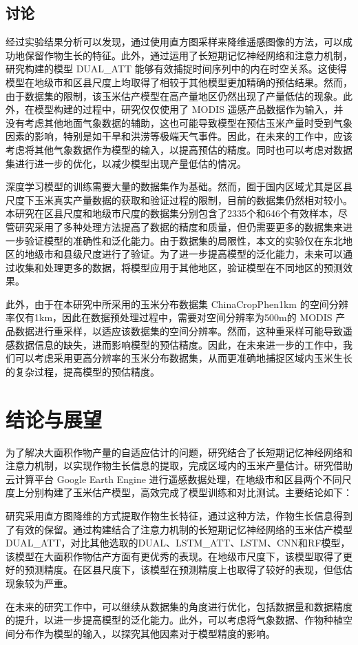 \subsection{讨论}
\par 经过实验结果分析可以发现，通过使用直方图采样来降维遥感图像的方法，可以成功地保留作物生长的特征。此外，通过运用了长短期记忆神经网络和注意力机制，研究构建的模型 DUAL\_ATT 能够有效捕捉时间序列中的内在时空关系。这使得模型在地级市和区县尺度上均取得了相较于其他模型更加精确的预估结果。然而，由于数据集的限制，该玉米估产模型在高产量地区仍然出现了产量低估的现象。此外，在模型构建的过程中，研究仅仅使用了 MODIS 遥感产品数据作为输入，并没有考虑其他地面气象数据的辅助，这也可能导致模型在预估玉米产量时受到气象因素的影响，特别是如干旱和洪涝等极端天气事件。因此，在未来的工作中，应该考虑将其他气象数据作为模型的输入，以提高预估的精度。同时也可以考虑对数据集进行进一步的优化，以减少模型出现产量低估的情况。

\par 深度学习模型的训练需要大量的数据集作为基础。然而，囿于国内区域尤其是区县尺度下玉米真实产量数据的获取和验证过程的限制，目前的数据集仍然相对较小。本研究在区县尺度和地级市尺度的数据集分别包含了2335个和646个有效样本，尽管研究采用了多种处理方法提高了数据的精度和质量，但仍需要更多的数据集来进一步验证模型的准确性和泛化能力。由于数据集的局限性，本文的实验仅在东北地区的地级市和县级尺度进行了验证。为了进一步提高模型的泛化能力，未来可以通过收集和处理更多的数据，将模型应用于其他地区，验证模型在不同地区的预测效果。

\par 此外，由于在本研究中所采用的玉米分布数据集 ChinaCropPhen1km 的空间分辨率仅有1km，因此在数据预处理过程中，需要对空间分辨率为500m的 MODIS 产品数据进行重采样，以适应该数据集的空间分辨率。然而，这种重采样可能导致遥感数据信息的缺失，进而影响模型的预估精度。因此，在未来进一步的工作中，我们可以考虑采用更高分辨率的玉米分布数据集，从而更准确地捕捉区域内玉米生长的复杂过程，提高模型的预估精度。

\section{结论与展望}
\par 为了解决大面积作物产量的自适应估计的问题，研究结合了长短期记忆神经网络和注意力机制，以实现作物生长信息的提取，完成区域内的玉米产量估计。研究借助云计算平台 Google Earth Engine 进行遥感数据处理，在地级市和区县两个不同尺度上分别构建了玉米估产模型，高效完成了模型训练和对比测试。主要结论如下：

\par 研究采用直方图降维的方式提取作物生长特征，通过这种方法，作物生长信息得到了有效的保留。通过构建结合了注意力机制的长短期记忆神经网络的玉米估产模型DUAL\_ATT，对比其他选取的DUAL、LSTM\_ATT、LSTM、CNN和RF模型，该模型在大面积作物估产方面有更优秀的表现。在地级市尺度下，该模型取得了更好的预测精度。在区县尺度下，该模型在预测精度上也取得了较好的表现，但低估现象较为严重。

\par 在未来的研究工作中，可以继续从数据集的角度进行优化，包括数据量和数据精度的提升，以进一步提高模型的泛化能力。此外，可以考虑将气象数据、作物种植空间分布作为模型的输入，以探究其他因素对于模型精度的影响。